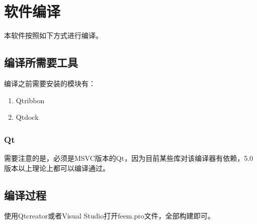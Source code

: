 \chapter{软件编译}
本软件按照如下方式进行编译。
\section{编译所需要工具}
编译之前需要安装的模块有：
\begin{enumerate}
	\item Qtribbon
	\item Qtdock
\end{enumerate}
\subsection{Qt}
需要注意的是，必须是MSVC版本的Qt，因为目前某些库对该编译器有依赖，5.0版本以上理论上都可以编译通过。
\section{编译过程}
使用Qtcreator或者Visual Studio打开feem.pro文件，全部构建即可。